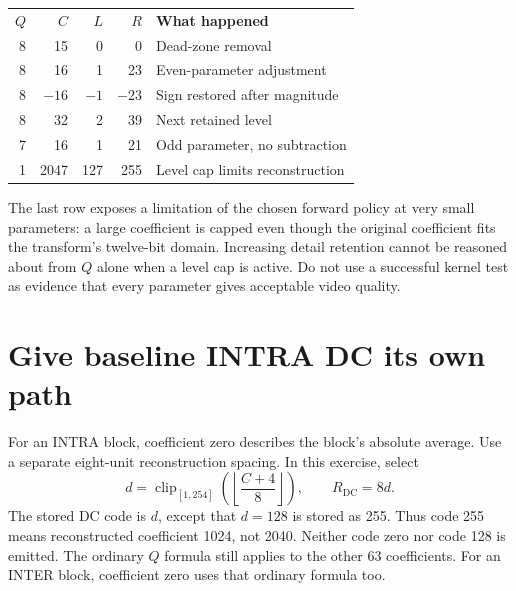 \begin{center}
  \begin{tabular}{rrrrl}
    \textbf{$Q$} & \textbf{$C$} & \textbf{$L$} & \textbf{$R$} & \textbf{What happened}          \\
    8            & 15           & 0            & 0            & Dead-zone removal               \\
    8            & 16           & 1            & 23           & Even-parameter adjustment       \\
    8            & $-16$        & $-1$         & $-23$        & Sign restored after magnitude   \\
    8            & 32           & 2            & 39           & Next retained level             \\
    7            & 16           & 1            & 21           & Odd parameter, no subtraction   \\
    1            & 2047         & 127          & 255          & Level cap limits reconstruction
  \end{tabular}
\end{center}
The last row exposes a limitation of the chosen forward policy at very small
parameters: a large coefficient is capped even though the original coefficient
fits the transform's twelve-bit domain. Increasing detail retention cannot be
reasoned about from $Q$ alone when a level cap is active. Do not use a successful
kernel test as evidence that every parameter gives acceptable video quality.

\section{Give baseline INTRA DC its own path}
For an INTRA block, coefficient zero describes the block's absolute average.
Use a separate eight-unit reconstruction spacing. In this exercise, select
\[
  d=\operatorname{clip}_{[1,254]}\!\left(\left\lfloor\frac{C+4}{8}\right\rfloor\right),
  \qquad R_{\mathrm{DC}}=8d.
\]
The stored DC code is $d$, except that $d=128$ is stored as 255. Thus code 255
means reconstructed coefficient 1024, not 2040. Neither code zero nor code 128
is emitted. The ordinary $Q$ formula still applies to the other 63 coefficients.
For an INTER block, coefficient zero uses that ordinary formula too.

